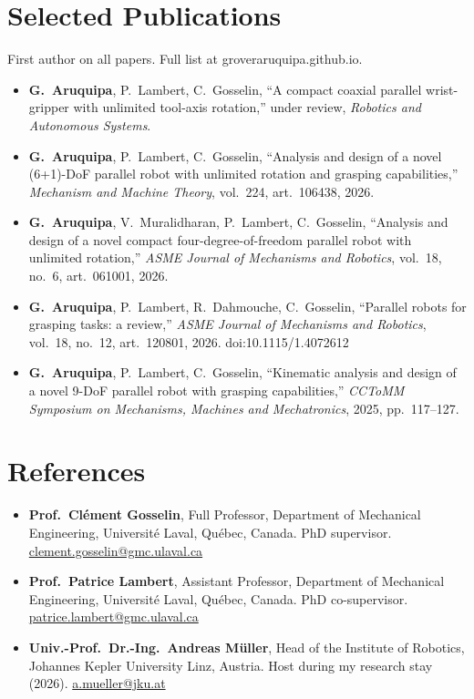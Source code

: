 \documentclass[10pt,a4paper]{article}
\begin{document}
\section{Selected Publications}
{\small First author on all papers. Full list at groveraruquipa.github.io.}\par\vspace{2pt}
\begin{itemize}
\item \textbf{G.~Aruquipa}, P.~Lambert, C.~Gosselin, ``A compact coaxial parallel wrist-gripper with unlimited tool-axis rotation,'' under review, \emph{Robotics and Autonomous Systems}.
\item \textbf{G.~Aruquipa}, P.~Lambert, C.~Gosselin, ``Analysis and design of a novel (6+1)-DoF parallel robot with unlimited rotation and grasping capabilities,'' \emph{Mechanism and Machine Theory}, vol.~224, art.~106438, 2026.
\item \textbf{G.~Aruquipa}, V.~Muralidharan, P.~Lambert, C.~Gosselin, ``Analysis and design of a novel compact four-degree-of-freedom parallel robot with unlimited rotation,'' \emph{ASME Journal of Mechanisms and Robotics}, vol.~18, no.~6, art.~061001, 2026.
\item \textbf{G.~Aruquipa}, P.~Lambert, R.~Dahmouche, C.~Gosselin, ``Parallel robots for grasping tasks: a review,'' \emph{ASME Journal of Mechanisms and Robotics}, vol.~18, no.~12, art.~120801, 2026. doi:10.1115/1.4072612
\item \textbf{G.~Aruquipa}, P.~Lambert, C.~Gosselin, ``Kinematic analysis and design of a novel 9-DoF parallel robot with grasping capabilities,'' \emph{CCToMM Symposium on Mechanisms, Machines and Mechatronics}, 2025, pp.~117--127.
\end{itemize}

\section{References}
\begin{itemize}
\item \textbf{Prof.~Cl\'ement Gosselin}, Full Professor, Department of Mechanical Engineering, Universit\'e Laval, Qu\'ebec,
Canada. PhD supervisor. \href{mailto:clement.gosselin@gmc.ulaval.ca}{clement.gosselin@gmc.ulaval.ca}
\item \textbf{Prof.~Patrice Lambert}, Assistant Professor, Department of Mechanical Engineering, Universit\'e Laval,
Qu\'ebec, Canada. PhD co-supervisor. \href{mailto:patrice.lambert@gmc.ulaval.ca}{patrice.lambert@gmc.ulaval.ca}
\item \textbf{Univ.-Prof.~Dr.-Ing.~Andreas M\"uller}, Head of the Institute of Robotics, Johannes Kepler University Linz,
Austria. Host during my research stay (2026). \href{mailto:a.mueller@jku.at}{a.mueller@jku.at}
\end{itemize}
\end{document}
